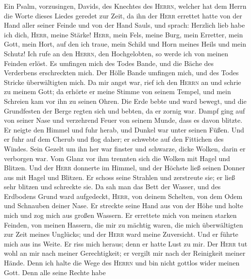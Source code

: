 Ein Psalm, vorzusingen, Davids, des Knechtes des
\textsc{Herrn}, welcher hat dem Herrn die Worte dieses Liedes geredet
zur Zeit, da ihn der \textsc{Herr} errettet hatte von der Hand aller
seiner Feinde und von der Hand Sauls,  und sprach:
Herzlich lieb habe ich dich, \textsc{Herr}, meine Stärke! 
\textsc{Herr}, mein Fels, meine Burg, mein Erretter, mein Gott, mein
Hort, auf den ich traue, mein Schild und Horn meines Heils und mein
Schutz!  Ich rufe an den \textsc{Herrn}, den Hochgelobten,
so werde ich von meinen Feinden erlöst.  Es umfingen mich
des Todes Bande, und die Bäche des Verderbens erschreckten mich.
 Der Hölle Bande umfingen mich, und des Todes Stricke
überwältigten mich.  Da mir angst war, rief ich den
\textsc{Herrn} an und schrie zu meinem Gott; da erhörte er meine Stimme
von seinem Tempel, und mein Schreien kam vor ihn zu seinen Ohren.
 Die Erde bebte und ward bewegt, und die Grundfesten der
Berge regten sich und bebten, da er zornig war.  Dampf
ging auf von seiner Nase und verzehrend Feuer von seinem Munde, dass es
davon blitzte.  Er neigte den Himmel und fuhr herab, und
Dunkel war unter seinen Füßen.  Und er fuhr auf dem
Cherub und flog daher; er schwebte auf den Fittichen des Windes.
 Sein Gezelt um ihn her war finster und schwarze, dicke
Wolken, darin er verborgen war.  Vom Glanz vor ihm
trennten sich die Wolken mit Hagel und Blitzen.  Und der
\textsc{Herr} donnerte im Himmel, und der Höchste ließ seinen Donner aus
mit Hagel und Blitzen.  Er schoss seine Strahlen und
zerstreute sie; er ließ sehr blitzen und schreckte sie. 
Da sah man das Bett der Wasser, und des Erdbodens Grund ward aufgedeckt,
\textsc{Herr}, von deinem Schelten, von dem Odem und Schnauben deiner
Nase.  Er streckte seine Hand aus von der Höhe und holte
mich und zog mich aus großen Wassern.  Er errettete mich
von meinen starken Feinden, von meinen Hassern, die mir zu mächtig
waren,  die mich überwältigten zur Zeit meines Unglücks;
und der \textsc{Herr} ward meine Zuversicht.  Und er
führte mich aus ins Weite. Er riss mich heraus; denn er hatte Lust zu
mir.  Der \textsc{Herr} tut wohl an mir nach meiner
Gerechtigkeit; er vergilt mir nach der Reinigkeit meiner Hände.
 Denn ich halte die Wege des \textsc{Herrn} und bin nicht
gottlos wider meinen Gott.  Denn alle seine Rechte habe
